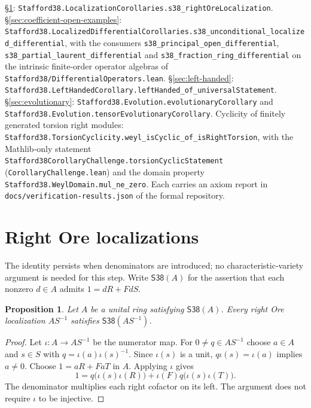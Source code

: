 \documentclass[11pt]{article}
\theoremstyle{plain}
\newtheorem{proposition}[theorem]{Proposition}
\theoremstyle{definition}
\theoremstyle{remark}
\theoremstyle{plain}
\newcommand{\phasestatus}[1]{%
  \par\smallskip\noindent{\footnotesize\sffamily\textbf{Lean status:} #1}%
  \par\smallskip}
\begin{document}
\begin{provbox}
\S\ref{sec:ore-localization}:
\texttt{Stafford38.\allowbreak LocalizationCorollaries.\allowbreak s38\_rightOreLocalization}.
\S\ref{sec:coefficient-open-examples}:
\texttt{Stafford38.\allowbreak LocalizedDifferentialCorollaries.\allowbreak s38\_unconditional\_localized\_differential},
with the consumers \texttt{s38\_principal\_open\_differential},
\texttt{s38\_partial\_laurent\_differential} and
\texttt{s38\_fraction\_ring\_differential} on the intrinsic finite-order
operator algebras of \texttt{Stafford38/DifferentialOperators.lean}.
\S\ref{sec:left-handed}:
\texttt{Stafford38.\allowbreak LeftHandedCorollary.\allowbreak leftHanded\_of\_universalStatement}.
\S\ref{sec:evolutionary}: \texttt{Stafford38.Evolution.evolutionaryCorollary}
and \texttt{Stafford38.Evolution.tensorEvolutionaryCorollary}.
Cyclicity of finitely generated torsion right modules:
\texttt{Stafford38.\allowbreak TorsionCyclicity.\allowbreak weyl\_isCyclic\_of\_isRightTorsion},
with the Mathlib-only statement \texttt{Stafford38CorollaryChallenge.\allowbreak torsionCyclicStatement}
(\texttt{CorollaryChallenge.lean}) and the domain property
\texttt{Stafford38.\allowbreak WeylDomain.\allowbreak mul\_ne\_zero}.
Each carries an axiom report in \texttt{docs/verification-results.json} of the
formal repository.
\end{provbox}


\section{Right Ore localizations}\label{sec:ore-localization}
\par{}
\phasestatus{Phase II complete.}


The identity persists when denominators are introduced; no characteristic-variety
argument is needed for this step. Write $\mathsf{S38}(A)$ for the assertion that
each nonzero $d\in A$ admits $1=dR+FdS$.

\begin{proposition}\label{prop:ore-localization}
Let $A$ be a unital ring satisfying $\mathsf{S38}(A)$. Every right Ore
localization $AS^{-1}$ satisfies $\mathsf{S38}(AS^{-1})$.
\end{proposition}
\begin{proof}
Let $\iota:A\to AS^{-1}$ be the numerator map. For $0\ne q\in AS^{-1}$ choose
$a\in A$ and $s\in S$ with $q=\iota(a)\iota(s)^{-1}$.
Since $\iota(s)$ is a unit, $q\iota(s)=\iota(a)$ implies $a\ne0$.
Choose $1=aR+FaT$ in $A$. Applying $\iota$ gives
\[
 1=q\bigl(\iota(s)\iota(R)\bigr)
   +\iota(F)q\bigl(\iota(s)\iota(T)\bigr).
\]
The denominator multiplies each right cofactor on its left.
The argument does not require $\iota$ to be injective.
\end{proof}
\end{document}
